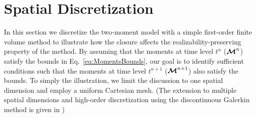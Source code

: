 \section{Spatial Discretization}\label{se:SpacialDiscretization}

In this section we discretize the two-moment model with a simple first-order finite volume method to illustrate how the closure affects the realizability-preserving property of the method.  
By assuming that the moments at time level $t^{n}$ ($\boldsymbol{\mathcal{M}}^{n}$) satisfy the bounds in Eq.~\eqref{eq:MomentsBounds}, our goal is to identify sufficient conditions such that the moments at time level $t^{n+1}$ ($\boldsymbol{\mathcal{M}}^{n+1}$) also satisfy the bounds.  
To simply the illustration, we limit the discussion to one spatial dimension and employ a uniform Cartesian mesh.  
(The extension to multiple spatial dimensions and high-order discretization using the discontinuous Galerkin method is given in \cite{chu_etal_2018})

